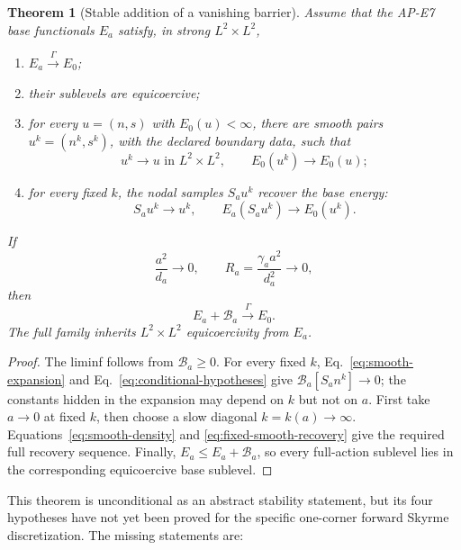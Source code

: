\documentclass[11pt]{article}
\numberwithin{equation}{section}
\newtheorem{theorem}{Theorem}[section]
\theoremstyle{definition}
\theoremstyle{remark}
\newcommand{\cB}{\mathcal B}
\begin{document}
\begin{theorem}[Stable addition of a vanishing barrier]
Assume that the AP-E7 base functionals $E_a$ satisfy, in strong
$L^2\times L^2$,

\begin{enumerate}[label=(\roman*)]
\item $E_a\xrightarrow{\Gamma}E_0$;
\item their sublevels are equicoercive;
\item for every $u=(n,s)$ with $E_0(u)<\infty$, there are smooth pairs
$u^k=(n^k,s^k)$, with the declared boundary data, such that
\begin{equation}
 u^k\to u\text{ in }L^2\times L^2,\qquad E_0(u^k)\to E_0(u);
 \label{eq:smooth-density}
\end{equation}
\item for every fixed $k$, the nodal samples $S_au^k$ recover the base
energy:
\begin{equation}
 S_au^k\to u^k,\qquad E_a(S_au^k)\to E_0(u^k).
 \label{eq:fixed-smooth-recovery}
\end{equation}
\end{enumerate}

If
\begin{equation}
 \frac{a^2}{d_a}\longrightarrow0,
 \qquad
 R_a=\frac{\gamma_a a^2}{d_a^2}\longrightarrow0,
 \label{eq:conditional-hypotheses}
\end{equation}
then
\begin{equation}
 E_a+\cB_a\xrightarrow{\Gamma}E_0.
 \label{eq:conditional-gamma}
\end{equation}
The full family inherits $L^2\times L^2$ equicoercivity from $E_a$.
\end{theorem}

\begin{proof}
The liminf follows from $\cB_a\ge0$.  For every fixed $k$,
Eq.~\eqref{eq:smooth-expansion} and
Eq.~\eqref{eq:conditional-hypotheses} give
$\cB_a[S_an^k]\to0$; the constants hidden in the expansion may depend on
$k$ but not on $a$.  First take $a\to0$ at fixed $k$, then choose a slow
diagonal $k=k(a)\to\infty$.  Equations~\eqref{eq:smooth-density} and
\eqref{eq:fixed-smooth-recovery} give the required full recovery sequence.
Finally,
$E_a\le E_a+\cB_a$, so every full-action sublevel lies in the corresponding
equicoercive base sublevel.
\end{proof}

This theorem is unconditional as an abstract stability statement, but its
four hypotheses have not yet been proved for the specific one-corner forward
Skyrme discretization.  The missing statements are:
\end{document}
